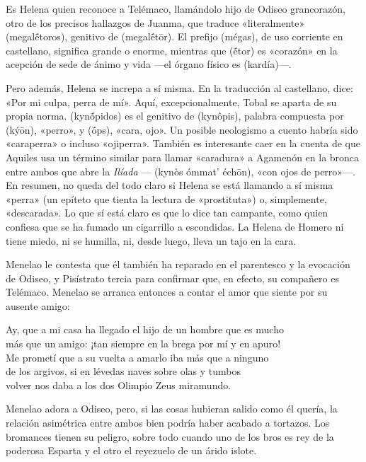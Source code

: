 Es Helena quien reconoce a Telémaco, llamándolo hijo de Odiseo grancorazón, otro de los precisos hallazgos de Juanma, que traduce «literalmente»  (megalḗtoros), genitivo de  (megalḗtōr). El prefijo  (mégas), de uso corriente en castellano, significa grande o enorme, mientras que  (ḗtor) es «corazón» en la acepción de sede de ánimo y vida ---el órgano físico es  (kardía)---.


Pero además, Helena se increpa a sí misma. En la traducción al castellano, dice: «Por mi culpa, perra de mí». Aquí, excepcionalmente, Tobal se aparta de su propia norma.  (kynṓpidos) es el genitivo de  (kynôpis), palabra compuesta por  (kýōn), «perro», y  (ṓps), «cara, ojo». Un posible neologismo a cuento habría sido «caraperra» o incluso «ojiperra». También es interesante caer en la cuenta de que Aquiles usa un término similar para llamar «caradura» a Agamenón en la bronca entre ambos que abre la \emph{Ilíada} --- (kynòs ómmat' échōn), «con ojos de perro»---. En resumen, no queda del todo claro si Helena se está llamando a sí misma «perra» (un epíteto que tienta la lectura de «prostituta») o, simplemente, «descarada». Lo que sí está claro es que lo dice tan campante, como quien confiesa que se ha fumado un cigarrillo a escondidas. La Helena de Homero ni tiene miedo, ni se humilla, ni, desde luego, lleva un tajo en la cara.

Menelao le contesta que él también ha reparado en el parentesco y la evocación de Odiseo, y Pisístrato tercia para confirmar que, en efecto, su compañero es Telémaco. Menelao se arranca entonces a contar el amor que siente por su ausente amigo:

\begin{versocita}
Ay, que a mi casa ha llegado el hijo de un hombre que es mucho\\
más que un amigo: ¡tan siempre en la brega por mí y en apuro!\\
Me prometí que a su vuelta a amarlo iba más que a ninguno\\
de los argivos, si en lévedas naves sobre olas y tumbos\\
volver nos daba a los dos Olimpio Zeus miramundo.
\end{versocita}

Menelao adora a Odiseo, pero, si las cosas hubieran salido como él quería, la relación asimétrica entre ambos bien podría haber acabado a tortazos. Los bromances tienen su peligro, sobre todo cuando uno de los bros es rey de la poderosa Esparta y el otro el reyezuelo de un árido islote.

